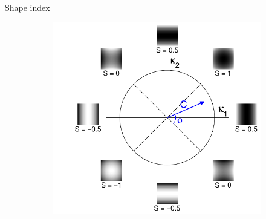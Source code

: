\documentclass[14pt,t]{beamer}
\begin{document}
\begin{frame}{Shape index}
\begin{figure}
\centering
	\begin{subfigure}[t]{0.75\textwidth}
		\includegraphics[width=\textwidth]{../report/img/shapeIndexTheory.pdf}
	\end{subfigure}
\end{figure}
\end{frame}
%
\end{document}
